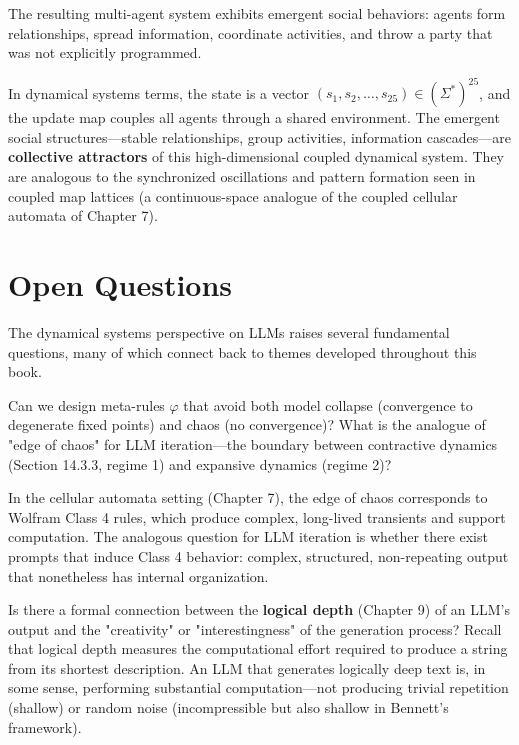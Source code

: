 The resulting multi-agent system exhibits emergent social behaviors: agents form relationships, spread information, coordinate activities, and throw a party that was not explicitly programmed.

In dynamical systems terms, the state is a vector $(s_1, s_2, \ldots, s_{25}) \in (\Sigma^*)^{25}$, and the update map couples all agents through a shared environment. The emergent social structures---stable relationships, group activities, information cascades---are \textbf{collective attractors} of this high-dimensional coupled dynamical system. They are analogous to the synchronized oscillations and pattern formation seen in coupled map lattices (a continuous-space analogue of the coupled cellular automata of Chapter 7).



\section{Open Questions}

The dynamical systems perspective on LLMs raises several fundamental questions, many of which connect back to themes developed throughout this book.

\begin{question}
Can we design meta-rules $\varphi$ that avoid both model collapse (convergence to degenerate fixed points) and chaos (no convergence)? What is the analogue of "edge of chaos" for LLM iteration---the boundary between contractive dynamics (Section 14.3.3, regime 1) and expansive dynamics (regime 2)?

In the cellular automata setting (Chapter 7), the edge of chaos corresponds to Wolfram Class 4 rules, which produce complex, long-lived transients and support computation. The analogous question for LLM iteration is whether there exist prompts that induce Class 4 behavior: complex, structured, non-repeating output that nonetheless has internal organization.
\end{question}

\begin{question}
Is there a formal connection between the \textbf{logical depth} (Chapter 9) of an LLM's output and the "creativity" or "interestingness" of the generation process? Recall that logical depth measures the computational effort required to produce a string from its shortest description. An LLM that generates logically deep text is, in some sense, performing substantial computation---not producing trivial repetition (shallow) or random noise (incompressible but also shallow in Bennett's framework).
\end{question}


